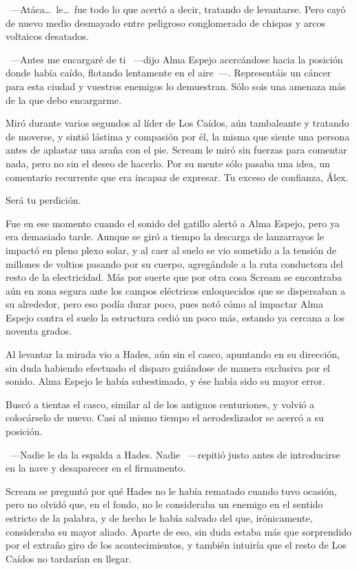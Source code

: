 ~---Atáca\dots\ le\dots\ fue todo lo que acertó a decir, tratando de levantarse. Pero cayó de nuevo medio desmayado entre peligroso conglomerado de chispas y arcos voltaicos desatados.

~---Antes me encargaré de ti ~---dijo Alma Espejo acercándose hacia la posición donde había caído, flotando lentamente en el aire~---. Representáis un cáncer para esta ciudad y vuestros enemigos lo demuestran. Sólo sois una amenaza más de la que debo encargarme.

Miró durante varios segundos al líder de Los Caídos, aún tambaleante y tratando de moverse, y sintió lástima y compasión por él, la misma que siente una persona antes de aplastar una araña con el pie. Scream le miró sin fuerzas para comentar nada, pero no sin el deseo de hacerlo. Por su mente sólo pasaba una idea, un comentario recurrente que era incapaz de expresar. Tu exceso de confianza, Álex.

Será tu perdición.

Fue en ese momento cuando el sonido del gatillo alertó a Alma Espejo, pero ya era demasiado tarde. Aunque se giró a tiempo la descarga de lanzarrayos le impactó en pleno plexo solar, y al caer al suelo se vio sometido a la tensión de millones de voltios pasando por su cuerpo, agregándole a la ruta conductora del resto de la electricidad. Más por suerte que por otra cosa Scream se encontraba aún en zona segura ante los campos eléctricos enloquecidos que se dispersaban a su alrededor, pero eso podía durar poco, pues notó cómo al impactar Alma Espejo contra el suelo la estructura cedió un poco más, estando ya cercana a los noventa grados.

Al levantar la mirada vio a Hades, aún sin el casco, apuntando en su dirección, sin duda habiendo efectuado el disparo guiándose de manera exclusiva por el sonido. Alma Espejo le había subestimado, y ése había sido su mayor error.

Buscó a tientas el casco, similar al de los antiguos centuriones, y volvió a colocárselo de nuevo. Casi al mismo tiempo el aerodeslizador se acercó a su posición.

~---Nadie le da la espalda a Hades. Nadie ~---repitió justo antes de introducirse en la nave y desaparecer en el firmamento.

Scream se preguntó por qué Hades no le había rematado cuando tuvo ocasión, pero no olvidó que, en el fondo, no le consideraba un enemigo en el sentido estricto de la palabra, y de hecho le había salvado del que, irónicamente, consideraba su mayor aliado. Aparte de eso, sin duda estaba más que sorprendido por el extraño giro de los acontecimientos, y también intuiría que el resto de Los Caídos no tardarían en llegar.

